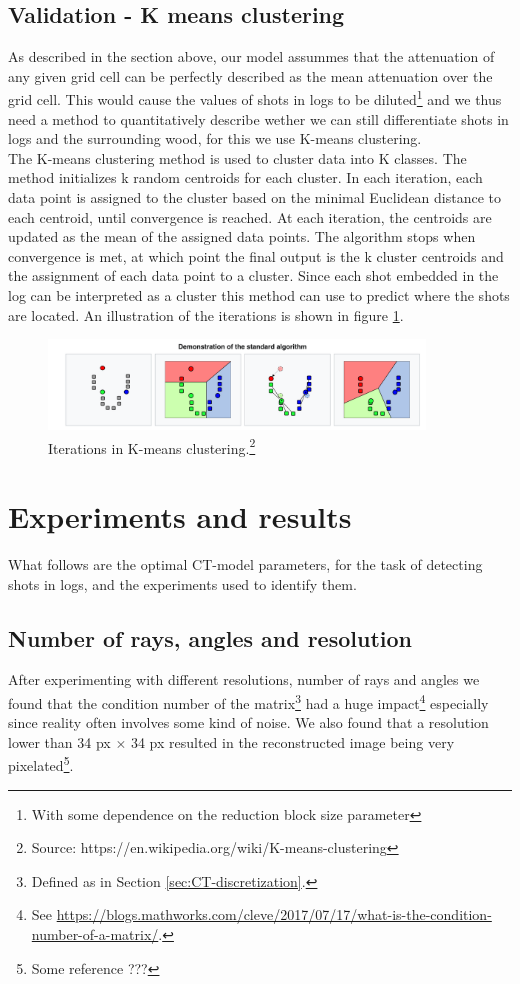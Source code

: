 \documentclass{article}
\begin{document}
\subsection{Validation - K means clustering}
As described in the section above, our model assummes that the attenuation of any given grid cell can be perfectly described as the mean attenuation over the grid cell. This would cause the values of shots in logs to be diluted\footnote{With some dependence on the reduction block size parameter} and we thus need a method to quantitatively describe wether we can still differentiate shots in logs and the surrounding wood, for this we use K-means clustering. \\
The K-means clustering method is used to cluster data into K classes. The method initializes k random centroids for each cluster. In each iteration, each data point is assigned to the cluster based on the minimal Euclidean distance to each centroid, until convergence is reached. At each iteration, the centroids are updated as the mean of the assigned data points. The algorithm stops when convergence is met, at which point the final output is the k cluster centroids and the assignment of each data point to a cluster. Since each shot embedded in the log can be interpreted as a cluster this method can use to predict where the shots are located. An illustration of the iterations is shown in figure \ref{Kmeans}. 
\begin{figure}[H]
    \centering
    \includegraphics[width=10cm]{images/Kmeans.png}
    \caption[Iterations in K-means clustering]{Iterations in K-means clustering.\footnote{Source: https://en.wikipedia.org/wiki/K-means-clustering}}
    \label{Kmeans}
\end{figure}


\section{Experiments and results}
What follows are the optimal CT-model parameters, for the task of detecting shots in logs, and the experiments used to identify them. 

\subsection{Number of rays, angles and resolution}\label{sec:num-rays-angles-resolution} 
After experimenting with different resolutions, number of rays and angles we found that the condition number of the matrix\footnote{Defined as in Section \ref{sec:CT-discretization}.} had a huge impact\footnote{See \url{https://blogs.mathworks.com/cleve/2017/07/17/what-is-the-condition-number-of-a-matrix/}.} especially since reality often involves some kind of noise. 
We also found that a resolution lower than 34 px $\times$ 34 px resulted in the reconstructed image being very pixelated\footnote{Some reference ???}. 
\end{document}
